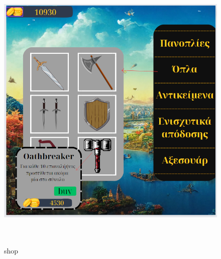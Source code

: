 \begin{figure}[!htb]
  \centering
    \centering
    \includegraphics[width=\textwidth,height=14cm]{mockup8.jpg}
    \caption{shop}
    \label{}
\end{figure}